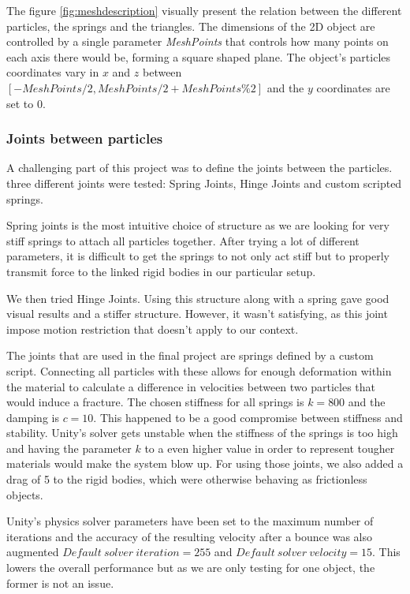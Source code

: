 \documentclass[tog]{acmsiggraph}
\begin{document}
The figure \ref{fig:meshdescription} visually present the relation between the different particles, the springs and the triangles. The dimensions of the 2D object are controlled by a single parameter \textit{MeshPoints} that controls how many points on each axis there would be, forming a square shaped plane. The object's particles coordinates vary in $x$ and $z$ between $[-MeshPoints/2, MeshPoints/2 + MeshPoints\% 2]$ and the $y$ coordinates are set to 0. 

\subsubsection{Joints between particles}
A challenging part of this project was to define the joints between the particles. three different joints were tested: Spring Joints, Hinge Joints and custom scripted springs. 

Spring joints is the most intuitive choice of structure as we are looking for very stiff springs to attach all particles together. After trying a lot of different parameters, it is difficult to get the springs to not only act stiff but to properly transmit force to the linked rigid bodies in our particular setup. 

We then tried Hinge Joints. Using this structure along with a spring gave good visual results and a stiffer structure. However, it wasn't satisfying, as this joint impose motion restriction that doesn't apply to our context.

The joints that are used in the final project are springs defined by a custom script. Connecting all particles with these allows for enough deformation within the material to calculate a difference in velocities between two particles that would induce a fracture. The chosen stiffness for all springs is $k = 800$ and the damping is $c = 10$. This happened to be a good compromise between stiffness and stability. Unity's solver gets unstable when the stiffness of the springs is too high and having the parameter $k$ to a even higher value in order to represent tougher materials would make the system blow up. For using those joints, we also added a drag of 5 to the rigid bodies, which were otherwise behaving as frictionless objects.  

Unity's physics solver parameters have been set to the maximum number of iterations and the accuracy of the resulting velocity after a bounce was also augmented $Default\ solver\ iteration = 255$ and $Default\ solver\ velocity = 15$. This lowers the overall performance but as we are only testing for one object, the former is not an issue.
\end{document}
